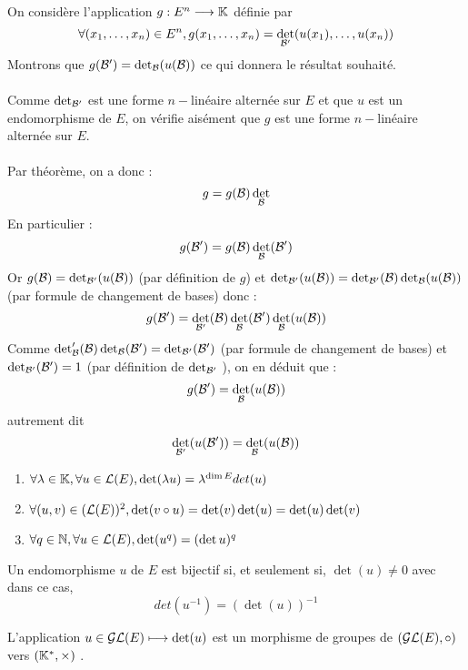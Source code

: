 \begin{dem}
    On considère l’application \(g : E^n \to \K\) définie par
    \[\forall  (x_1, \dots , x_n) \in E^n, g (x_1, \dots , x_n) = \det_{\cal{B}'}(u(x_1), \dots , u(x_n))\]
    Montrons que \(g(\cal{B}') = \det_{\cal{B}} (u(\cal{B}))\) ce qui donnera le résultat souhaité.\\~\\
    Comme \(\det_{\cal{B}'}\) est une forme \(n-\)linéaire alternée sur \(E\) et que \(u\) est un endomorphisme de \(E\), on vérifie aisément que \(g\) est une forme \(n-\)linéaire alternée sur \(E\).\\~\\
    Par théorème, on a donc :
    \[g = g(\cal{B}) \det_{\cal{B}}\]
    En particulier :
    \[g(\cal{B}') = g(\cal{B}) \det_{\cal{B}} (\cal{B}') \]
    Or \(g(\cal{B}) = \det_{\cal{B}'} (u(\cal{B}))\) (par définition de \(g\)) et \(\det_{\cal{B}'} (u(\cal{B})) = \det_{\cal{B}'} (\cal{B}) \det_{\cal{B}}(u(\cal{B}))\) (par formule de changement de bases) donc :
    \[g(\cal{B}') = \det_{\cal{B}'} (\cal{B}) \det_{\cal{B}} (\cal{B}') \det_{\cal{B}} (u(\cal{B}))\]
    Comme \(\det_{\cal{B}}' (\cal{B}) \det_{\cal{B}} (\cal{B}') = \det_{\cal{B}'} (\cal{B}')\) (par formule de changement de bases) et \(\det_{\cal{B}'} (\cal{B}') = 1\) (par définition de \(\det_{\cal{B}'}\) ), on en déduit que :
    \[g(\cal{B}') = \det_{\cal{B}} (u(\cal{B}))\]
    autrement dit
    \[\det_{\cal{B}'} (u(\cal{B}')) = \det_{\cal{B}} (u(\cal{B})) \]
\end{dem}
\begin{prop}
    \begin{enumerate}
        \item \(\forall \lambda \in  \K, \forall u \in  \cal{L}(E), \det (\lambda u) = \lambda ^{\dim E} det (u)\)
        \item \(\forall (u, v) \in  (\cal{L}(E))^2 , \det (v \circ u) = \det (v) \det (u) = \det (u) \det (v)\)
        \item \(\forall q \in \N, \forall u \in  \cal{L}(E) , \det (u^q) = (\det u)^q \)
    \end{enumerate}
\end{prop}

\begin{defprop}
    Un endomorphisme \(u\) de \(E\) est bijectif si, et seulement si, \(\det (u)\neq 0\) avec dans ce cas,
    \[det (u^{-1}) = (\det (u))^{-1}\]
\end{defprop}
\begin{defprop}
    L’application \(u \in  \cal{GL}(E) \mapsto \det (u)\) est un morphisme de groupes de \(\paren{\cal{GL}(E), \circ}\) vers \(\paren{\Ks, \times}\) .
\end{defprop}

